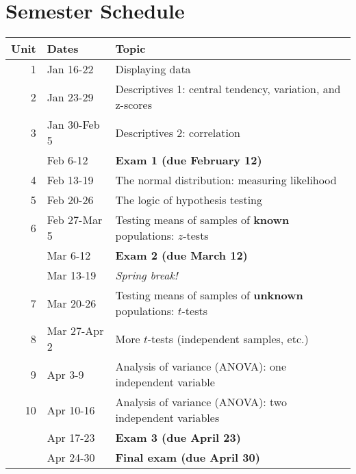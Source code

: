 \documentclass[10pt]{article}
\begin{document}
\section*{Semester Schedule}
\label{sec-10}
\begin{center}
\begin{tabular}{rll}
Unit & Dates & Topic\\
\hline
1 & Jan 16-22 & Displaying data\\
2 & Jan 23-29 & Descriptives 1: central tendency, variation, and z-scores\\
3 & Jan 30-Feb 5 & Descriptives 2: correlation\\
 & Feb 6-12 & \textbf{Exam 1 (due February 12)}\\
4 & Feb 13-19 & The normal distribution: measuring likelihood\\
5 & Feb 20-26 & The logic of hypothesis testing\\
6 & Feb 27-Mar 5 & Testing means of samples of \textbf{known} populations: $z$-tests\\
 & Mar 6-12 & \textbf{Exam 2 (due March 12)}\\
 & Mar 13-19 & \emph{Spring break!}\\
7 & Mar 20-26 & Testing means of samples of \textbf{unknown} populations: $t$-tests\\
8 & Mar 27-Apr 2 & More $t$-tests (independent samples, etc.)\\
9 & Apr 3-9 & Analysis of variance (ANOVA): one independent variable\\
10 & Apr 10-16 & Analysis of variance (ANOVA): two independent variables\\
 & Apr 17-23 & \textbf{Exam 3 (due April 23)}\\
 & Apr 24-30 & \textbf{Final exam (due April 30)}\\
\end{tabular}
\end{center}
\end{document}
